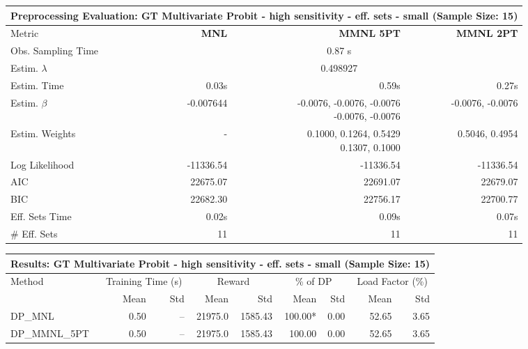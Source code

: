 
\begin{samepage}
\begin{center}
  \small
  \begin{tabular}{l|r|r|r}
    \toprule
    \multicolumn{4}{c}{\textbf{Preprocessing Evaluation: GT Multivariate Probit - high sensitivity - eff. sets - small (Sample Size: 15)}} \\
    \midrule
    Metric & \textbf{MNL} & \textbf{MMNL 5PT} & \textbf{MMNL 2PT} \\
    \midrule
    Obs. Sampling Time & \multicolumn{3}{c}{0.87 s} \\
    Estim. $\lambda$ & \multicolumn{3}{c}{0.498927} \\
    Estim. Time & 0.03s & 0.59s & 0.27s \\
    Estim. $\beta$ & -0.007644 & \makecell[tr]{-0.0076, -0.0076, -0.0076 \\ -0.0076, -0.0076} & -0.0076, -0.0076 \\
    Estim. Weights & - & \makecell[tr]{0.1000, 0.1264, 0.5429 \\ 0.1307, 0.1000} & 0.5046, 0.4954 \\
    Log Likelihood & -11336.54 & -11336.54 & -11336.54 \\
    AIC & 22675.07 & 22691.07 & 22679.07 \\
    BIC & 22682.30 & 22756.17 & 22700.77 \\
    Eff. Sets Time & 0.02s & 0.09s & 0.07s \\
    \# Eff. Sets & 11 & 11 & 11 \\
    \bottomrule
  \end{tabular}
\end{center}
\begin{center}
  \small
  \begin{tabular}{l|rr|rr|rr|rr}
    \toprule
    \multicolumn{9}{c}{\textbf{Results: GT Multivariate Probit - high sensitivity - eff. sets - small (Sample Size: 15)}} \\
    \midrule
    Method & \multicolumn{2}{c|}{Training Time (s)} & \multicolumn{2}{c|}{Reward} & \multicolumn{2}{c|}{\% of DP} & \multicolumn{2}{c}{Load Factor (\%)} \\
    & Mean & Std & Mean & Std & Mean & Std & Mean & Std \\
    \midrule
    DP\_MNL      &     0.50 &    -- &    21975.0 &    1585.43 & 100.00* &    0.00 &   52.65 &    3.65 \\
    DP\_MMNL\_5PT &     0.50 &    -- &    21975.0 &    1585.43 &  100.00 &    0.00 &   52.65 &    3.65 \\

\end{tabular}
\end{center}
\end{samepage}
